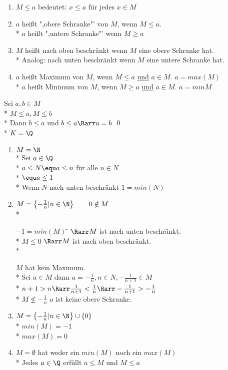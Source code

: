 	\begin{enumerate}
	\item{$M \leq a$ bedeutet: $x \leq a$ für jedes $x \in M$}
	\item{$a$ heißt ",obere Schranke"' von $M$, wenn $M \leq a$.\\*
		$a$ heißt ",untere Schranke"' wenn $M \geq a$}
	\item{$M$ heißt nach oben beschränkt wenn $M$ eine obere Schranke hat.\\*
	Analog: nach unten beschränkt wenn $M$ eine untere Schranke hat.}
	\item{$a$ heißt Maximum von $M$, wenn $M \leq a$ \ul{und} $a \in M$. $a = max(M)$\\*
		$a$ heißt Minimum von $M$, wenn $M \geq a$ \ul{und} $a \in M$. $a = min{M}$}
	\end{enumerate}
\bew
	Sei $a, b \in M$\\*
	$M \leq a, M \leq b$\\*
	Dann $b \leq a$ und $b \leq a \Rarr a = b$ \qed\\*
\bsp
	$K = \Q$
	\begin{enumerate}
	\item{$M = \N$\\*
	Sei $a \in \Q$\\*
	$a \leq N \equ a \leq n$ für alle $n \in N$\\*
	\phantom{$a \leq \N $} $\equ a \leq 1$\\*
	Wenn $N$ nach unten beschränkt $1 = min(N)$}
	\item{$M = \left\lbrace -\frac{1}{n} | n \in \N \right\rbrace \qquad 0 \notin M$\\*
	\begin{tabbing}
	$-1 = min(M)$ \= $\Rarr M$ ist nach unten beschränkt.\\*
	$M \leq 0$	\> $\Rarr M$ ist nach oben beschränkt.\\*
	\end{tabbing}
	$M$ hat kein Maximum.\\*
	Sei $a \in M$ dann $a = -\frac{1}{n}, n \in N, -\frac{1}{n + 1} \in M$\\*
	$n + 1 > n \Rarr \frac{1}{n + 1} < \frac{1}{n} \Rarr -\frac{1}{n + 1} > -\frac{1}{n}$\\*
	$M \nleq -\frac{1}{n}$ $a$ ist keine obere Schranke.}
	\item{$M = \left\lbrace -\frac{1}{n} | n \in \N\right\rbrace \cup \{ 0 \}$\\*
	$min(M) = -1$\\*
	$max(M) = 0$}
	\item{$M = \emptyset$ hat weder ein $min(M)$ noch ein $max(M)$\\*
	Jedes $a \in \Q$ erfüllt $a \leq M$ und $M \leq a$}
	\end{enumerate}
